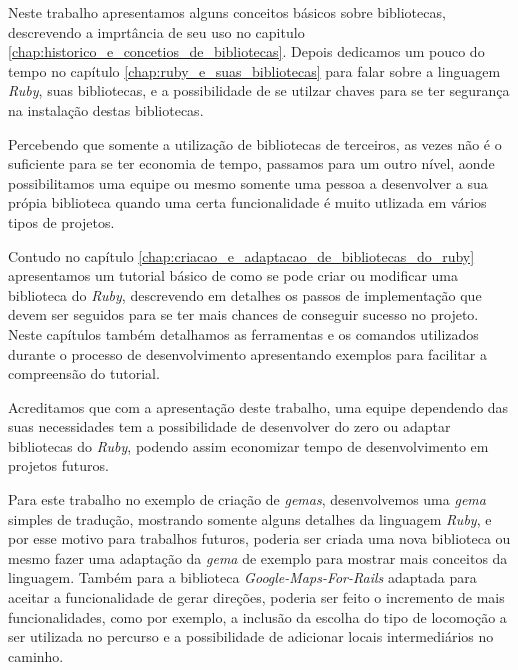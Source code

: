 Neste trabalho apresentamos alguns conceitos básicos sobre bibliotecas, descrevendo a imprtância de seu 
uso no capitulo \ref{chap:historico_e_concetios_de_bibliotecas}. Depois dedicamos um pouco do tempo 
no capítulo \ref{chap:ruby_e_suas_bibliotecas} para falar sobre a linguagem \emph{Ruby}, suas 
bibliotecas, e a possibilidade de se utilzar chaves para se ter segurança na instalação destas bibliotecas.

Percebendo que somente a utilização de bibliotecas de terceiros, as vezes não é o suficiente para se 
ter economia de tempo, passamos para um outro nível, aonde possibilitamos uma equipe ou mesmo somente 
uma pessoa a desenvolver a sua própia biblioteca quando uma certa funcionalidade é muito utlizada em vários 
tipos de projetos.

Contudo no capítulo \ref{chap:criacao_e_adaptacao_de_bibliotecas_do_ruby} apresentamos um tutorial 
básico de como se pode criar ou modificar uma biblioteca do \emph{Ruby}, descrevendo em detalhes os 
passos de implementação que devem ser seguidos para se ter mais chances de conseguir sucesso no 
projeto. Neste capítulos também detalhamos as ferramentas e os comandos utilizados durante o processo de 
desenvolvimento apresentando exemplos para facilitar a compreensão do tutorial.

Acreditamos que com a apresentação deste trabalho, uma equipe dependendo das suas necessidades tem 
a possibilidade de desenvolver do zero ou adaptar bibliotecas do \emph{Ruby}, podendo assim 
economizar tempo de desenvolvimento em projetos futuros.

Para este trabalho no exemplo de criação de \emph{gemas}, desenvolvemos uma \emph{gema} simples de 
tradução, mostrando somente alguns detalhes da linguagem \emph{Ruby}, e por esse motivo para 
trabalhos futuros, poderia ser criada uma nova biblioteca ou mesmo fazer uma adaptação da 
\emph{gema} de exemplo para mostrar mais conceitos da linguagem. Também para a biblioteca 
\emph{Google-Maps-For-Rails} adaptada para aceitar a funcionalidade de gerar direções, poderia ser feito o 
incremento de mais funcionalidades, como por exemplo, a inclusão da escolha do tipo de locomoção a ser 
utilizada no percurso e a possibilidade de adicionar locais intermediários no caminho.